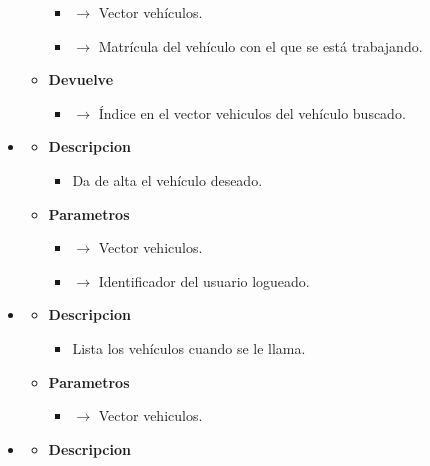 \begin{itemize}
\begin{itemize}
		\begin{itemize}
			\item {} $\rightarrow$ Vector vehículos.
            \item {} $\rightarrow$ Matrícula del vehículo con el que se está trabajando.
		\end{itemize}
        \item \textbf{Devuelve}
		\begin{itemize}
			\item {} $\rightarrow$ Índice en el vector vehiculos del vehículo buscado.
		\end{itemize}
	\end{itemize}
    \item{}
	\begin{itemize}
		\item \textbf{Descripcion}
        \begin{itemize}
			\item Da de alta el vehículo deseado.
		\end{itemize}
        \item \textbf{Parametros}
		\begin{itemize}
			\item {} $\rightarrow$ Vector vehiculos.
            \item {} $\rightarrow$ Identificador del usuario logueado.
		\end{itemize}
	\end{itemize}
	\item{}
	\begin{itemize}
		\item \textbf{Descripcion}
        \begin{itemize}
			\item Lista los vehículos cuando se le llama.
		\end{itemize}
        \item \textbf{Parametros}
		\begin{itemize}
			\item {} $\rightarrow$ Vector vehiculos.
		\end{itemize}
	\end{itemize}
    \item{}
	\begin{itemize}
		\item \textbf{Descripcion}
        \begin{itemize}

\end{itemize}
\end{itemize}
\end{itemize}
